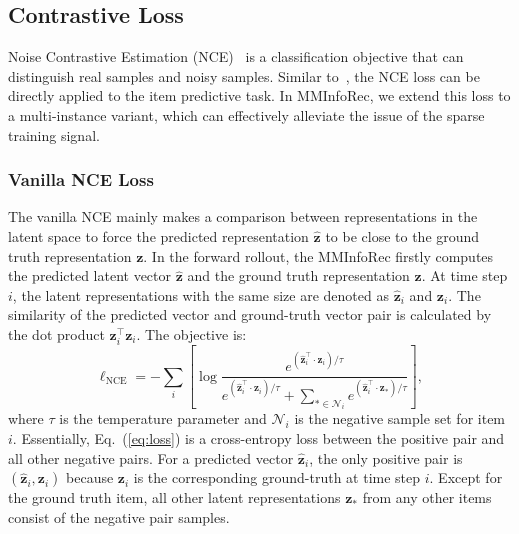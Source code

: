 \documentclass[conference]{IEEEtran}
\begin{document}
\subsection{Contrastive Loss}
\label{sec:con-loss}
Noise Contrastive Estimation (NCE)~\cite{nce} is a classification objective that can distinguish real samples and noisy samples. Similar to~\cite{nce2,cpc}, the NCE loss can be directly applied to the item predictive task. In MMInfoRec, we extend this loss to a multi-instance variant, which can effectively alleviate the issue of the sparse training signal.

\subsubsection{Vanilla NCE Loss}
The vanilla NCE mainly makes a comparison between representations in the latent space to force the predicted representation $\hat{\mathbf{z}}$ to be close to the ground truth representation $\mathbf{z}$. In the forward rollout, the MMInfoRec firstly computes the predicted latent vector $\hat{\mathbf{z}}$ and the ground truth representation $\mathbf{z}$. At time step $i$, the latent representations with the same size are denoted as $\hat{\mathbf{z}}_i$ and $\mathbf{z}_i$. The similarity of the predicted vector and ground-truth vector pair is calculated by the dot product $\mathbf{z}_i^\top\mathbf{z}_i$. The objective is:
\begin{equation}
\label{eq:loss}
    \ell_\text{NCE}=-\sum_{i}\left[\log \frac{e^{\left(\hat{\mathbf{z}}_{i}^{\top} \cdot \mathbf{z}_{i}\right)/\tau}}{e^{\left(\hat{\mathbf{z}}_{i}^{\top} \cdot \mathbf{z}_{i}\right)/\tau}+\sum\limits_{* \in \mathcal{N}_i} e^{\left(\hat{\mathbf{z}}_{i}^{\top} \cdot \mathbf{z}_{*}\right)/\tau}}\right],
\end{equation}
where $\tau$ is the temperature parameter and $\mathcal{N}_i$ is the negative sample set for item $i$. Essentially, Eq.~(\ref{eq:loss}) is a cross-entropy loss between the positive pair and all other negative pairs. For a predicted vector $\hat{\mathbf{z}}_i$, the only positive pair is $(\hat{\mathbf{z}}_i,\mathbf{z}_i)$ because $\mathbf{z}_i$ is the corresponding ground-truth at time step $i$. Except for the ground truth item, all other latent representations $\mathbf{z}_*$ from any other items consist of the negative pair samples.
\end{document}
